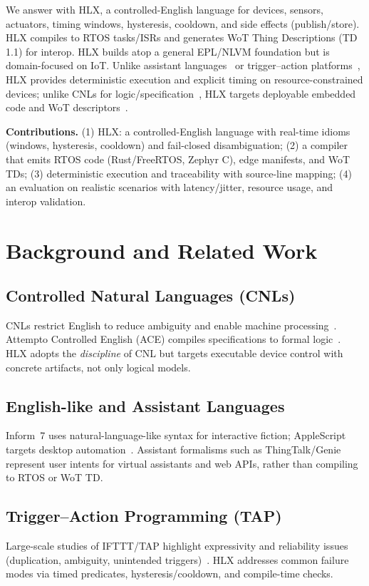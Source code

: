 \documentclass[journal]{IEEEtran}
\begin{document}
We answer with HLX, a controlled-English language for devices, sensors, actuators, timing windows, hysteresis, cooldown, and side effects (publish/store). HLX compiles to RTOS tasks/ISRs and generates WoT Thing Descriptions (TD 1.1) for interop. HLX builds atop a general EPL/NLVM foundation but is domain-focused on IoT. Unlike assistant languages~\cite{ThingTalk22,GeniePLDI19} or trigger–action platforms~\cite{UrIFTTT16,BrackenburyTAP19}, HLX provides deterministic execution and explicit timing on resource-constrained devices; unlike CNLs for logic/specification~\cite{KuhnCNL14,ACEManual}, HLX targets deployable embedded code and WoT descriptors~\cite{WoT11}.

\textbf{Contributions.} (1) HLX: a controlled-English language with real-time idioms (windows, hysteresis, cooldown) and fail-closed disambiguation; (2) a compiler that emits RTOS code (Rust/FreeRTOS, Zephyr C), edge manifests, and WoT TDs; (3) deterministic execution and traceability with source-line mapping; (4) an evaluation on realistic scenarios with latency/jitter, resource usage, and interop validation.

\section{Background and Related Work}
\subsection{Controlled Natural Languages (CNLs)}
CNLs restrict English to reduce ambiguity and enable machine processing~\cite{KuhnCNL14}. Attempto Controlled English (ACE) compiles specifications to formal logic~\cite{ACEManual}. HLX adopts the \emph{discipline} of CNL but targets executable device control with concrete artifacts, not only logical models.

\subsection{English-like and Assistant Languages}
Inform~7 uses natural-language-like syntax for interactive fiction; AppleScript targets desktop automation~\cite{InformSite,AppleScriptGuide}. Assistant formalisms such as ThingTalk/Genie~\cite{ThingTalk22,GeniePLDI19} represent user intents for virtual assistants and web APIs, rather than compiling to RTOS or WoT TD.

\subsection{Trigger–Action Programming (TAP)}
Large-scale studies of IFTTT/TAP highlight expressivity and reliability issues (duplication, ambiguity, unintended triggers)~\cite{UrIFTTT16,BrackenburyTAP19}. HLX addresses common failure modes via timed predicates, hysteresis/cooldown, and compile-time checks.
\end{document}
